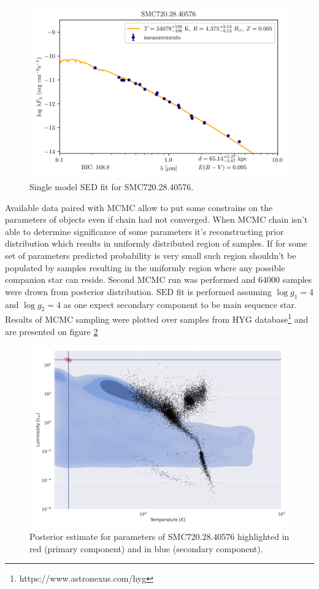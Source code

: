 \documentclass{pracalicmgr}
\begin{document}
\begin{figure}[H]
    \centering
    \includegraphics[scale=1]{plots/SMC720.28.40576_simple_emcee.png}
    \caption{Single model SED fit for SMC720.28.40576.}
    \label{SMC720:sed}
\end{figure}
Available data paired with MCMC allow to put some constrains on the parameters of objects even if chain had not converged. 
When MCMC chain isn't able to determine significance of some parameters it's reconstructing prior distribution 
which results in uniformly distributed region of samples. If for some set of parameters predicted probability is very small 
such region shouldn't be populated by samples resulting in the uniformly region where any possible companion star 
can reside. Second MCMC run was performed and $64000$ samples were drown from posterior distribution. 
SED fit is performed assuming $\log g_1=4$ and $\log g_2=4$ as one expect secondary component to be 
main sequence star. 
Results of MCMC sampling were plotted over samples from HYG
database\footnote{https://www.astronexus.com/hyg} and are presented on figure \ref{posterior}
\begin{figure}[H]
    \includegraphics[scale=0.6]{plots/posterior_estimate_SMC720.png}
    \caption{Posterior estimate for parameters of SMC720.28.40576 highlighted in red (primary component)
    and in blue (secondary component).}\label{posterior}
\end{figure}
\end{document}
